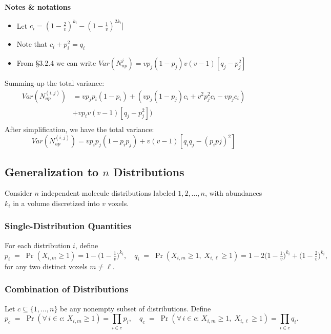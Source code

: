 \documentclass{article}
\begin{document}
\textbf{Notes \& notations}
\begin{itemize}
    \item Let $c_i = (1-\frac{2}{v})^{k_i} - (1-\frac{1}{v})^{2k_i}]$
    \item Note that $c_i + p^2_i = q_i$
    \item From \S3.2.4 we can write $Var(N^j_{up}) = vp_j(1-p_j) v(v-1)[q_j-p_j^2]$
\end{itemize}

Summing-up the total variance:
\[\begin{split}
    Var(N^{(i,j)}_{up}) &= vp_jp_i(1-p_i) + (vp_j(1-p_j)c_i + v^2p^2_jc_i - vp_jc_i) \\
        &+vp_iv(v-1)[q_j-p_j^2]) \\
\end{split}
\]
After simplification, we have the total variance:
\begin{equation}
    Var(N^{(i,j)}_{up}) = vp_ip_j(1-p_ip_j) + v(v-1)[q_iq_j-(p_ipj)^2]
\end{equation}

\newpage
\subsection{Generalization to \(n\) Distributions}

Consider \(n\) independent molecule distributions labeled \(1,2,\dots,n\), with abundances \(k_i\) in a volume discretized into \(v\) voxels.

\subsubsection{Single-Distribution Quantities}

For each distribution \(i\), define
\[
p_i \;=\;\Pr(X_{i,m}\ge1)
=1-\bigl(1-\tfrac1v\bigr)^{k_i},
\quad
q_i \;=\;\Pr(X_{i,m}\ge1,\;X_{i,\ell}\ge1)
=1 - 2\bigl(1-\tfrac1v\bigr)^{k_i} + \bigl(1-\tfrac2v\bigr)^{k_i},
\]
for any two distinct voxels \(m\neq\ell\).

\subsubsection{Combination of Distributions}

Let \(c\subseteq\{1,\dots,n\}\) be any nonempty subset of distributions.  Define
\[
p_c \;=\;\Pr(\forall\,i\in c:\,X_{i,m}\ge1)
=\prod_{i\in c} p_i,
\quad
q_c \;=\;\Pr(\forall\,i\in c:\,X_{i,m}\ge1,\;X_{i,\ell}\ge1)
=\prod_{i\in c} q_i.
\]
\end{document}
